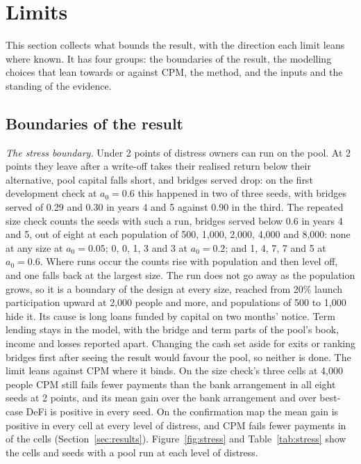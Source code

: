 \section{Limits}\label{sec:limits}

This section collects what bounds the result, with the direction each limit leans where known. It
has four groups: the boundaries of the result, the modelling choices that lean towards or against CPM, the
method, and the inputs and the standing of the evidence.

\subsection{Boundaries of the result}

\emph{The stress boundary.} Under 2 points of distress owners can run on the pool. At 2 points they leave after a
write-off takes their realised return below their alternative, pool capital falls short, and bridges served drop:
on the first development check at $a_{0} = 0.6$ this happened in two of three seeds, with bridges served of 0.29 and
0.30 in years 4 and 5 against 0.90 in the third. The repeated size check counts the seeds with such a run, bridges
served below 0.6 in years 4 and 5, out of eight at each population of 500, 1,000, 2,000, 4,000 and 8,000: none at any
size at $a_{0} = 0.05$; 0, 0, 1, 3 and 3 at $a_{0} = 0.2$; and 1, 4, 7, 7 and 5 at $a_{0} = 0.6$. Where runs occur the counts rise with
population and then level off, and one falls back at the largest size. The run does not go away as the population
grows, so it is a boundary of the design at every size, reached from 20\% launch
participation upward at 2,000 people and more, and populations of 500 to 1,000 hide it. Its cause is long loans funded by capital on two months' notice. Term
lending stays in the model, with the bridge and term parts of the pool's book, income and losses reported
apart. Changing the cash set aside for exits or ranking bridges first after seeing the result would favour the
pool, so neither is done. The limit leans against CPM where it binds. On the size check's three cells at 4,000
people CPM still fails fewer payments than the bank arrangement in all eight seeds at 2 points, and its mean gain
over the bank arrangement and over best-case DeFi is positive in every seed. On the confirmation map the mean gain
is positive in every cell at every level of distress, and CPM fails fewer payments in \CellsFewerFailures{} of the
\CellsAll{} cells (Section~\ref{sec:results}). Figure~\ref{fig:stress} and Table~\ref{tab:stress} show the cells and seeds
with a pool run at each level of distress.

